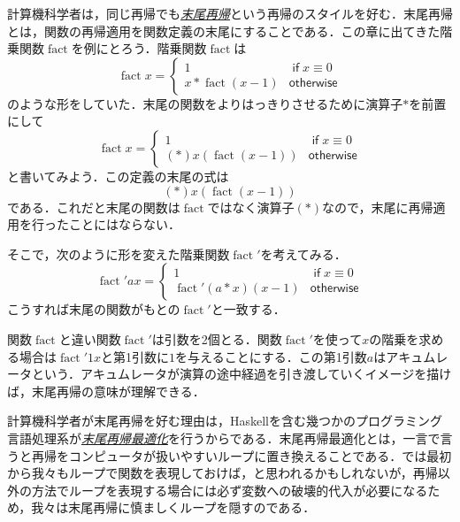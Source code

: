 \documentclass[a4paper,draft]{jsbook}
\newcommand{\programminglanguage}[1]{\textsf{#1}}
\newcommand{\haskell}{\programminglanguage{Haskell}}
\newcommand{\keyword}[1]{{\underline{\emph{#1}}}}
\DeclareMathOperator{\mathFactorial}{fact}
\newcommand{\mathKeyword}[1]{\operatorname{\textsf{#1}}}
\newcommand{\mathIf}{\mathKeyword{if}}
\newcommand{\mathOtherwise}{\mathKeyword{otherwise}}
\begin{document}
計算機科学者は，同じ再帰でも\keyword{末尾再帰}という再帰のスタイルを好む．末尾再帰とは，関数の再帰適用を関数定義の末尾にすることである．この章に出てきた階乗関数$\mathFactorial$を例にとろう．階乗関数$\mathFactorial$は
\begin{equation}
\mathFactorial x=\begin{cases}
1&\mathIf x\equiv0\\
x*\mathFactorial(x-1)&\mathOtherwise
\end{cases}
\end{equation}
のような形をしていた．末尾の関数をよりはっきりさせるために演算子$*$を前置にして
\begin{equation}
\mathFactorial x=\begin{cases}
1&\mathIf x\equiv0\\
(*)x(\mathFactorial(x-1))&\mathOtherwise
\end{cases}
\end{equation}
と書いてみよう．この定義の末尾の式は
\begin{equation}
(*)x(\mathFactorial(x-1))
\end{equation}
である．これだと末尾の関数は$\mathFactorial$ではなく演算子$(*)$なので，末尾に再帰適用を行ったことにはならない．

そこで，次のように形を変えた階乗関数$\mathFactorial'$を考えてみる．
\begin{equation}
\mathFactorial'ax=\begin{cases}
1&\mathIf x\equiv0\\
\mathFactorial'(a*x)(x-1)&\mathOtherwise
\end{cases}
\end{equation}
こうすれば末尾の関数がもとの$\mathFactorial'$と一致する．

関数$\mathFactorial$と違い関数$\mathFactorial'$は引数を2個とる．関数$\mathFactorial'$を使って$x$の階乗を求める場合は$\mathFactorial'1x$と第1引数に$1$を与えることにする．この第1引数$a$はアキュムレータという．アキュムレータが演算の途中経過を引き渡していくイメージを描けば，末尾再帰の意味が理解できる．

計算機科学者が末尾再帰を好む理由は，\haskell を含む幾つかのプログラミング言語処理系が\keyword{末尾再帰最適化}を行うからである．末尾再帰最適化とは，一言で言うと再帰をコンピュータが扱いやすいループに置き換えることである．では最初から我々もループで関数を表現しておけば，と思われるかもしれないが，再帰以外の方法でループを表現する場合には必ず変数への破壊的代入が必要になるため，我々は末尾再帰に慎ましくループを隠すのである．
\end{document}
